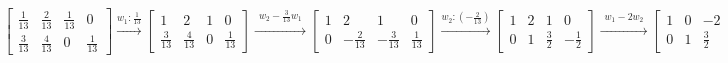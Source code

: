 \documentclass{article}
\begin{document}
    \[
        \begin{align*}
            \begin{bmatrix}
                \frac{1}{13} & \frac{2}{13} & \frac{1}{13} & 0\\\frac{3}{13} & \frac{4}{13} & 0 & \frac{1}{13}
            \end{bmatrix}
            \xrightarrow{w_{1} : \frac{1}{13}} \begin{bmatrix}
                                                   1 & 2 & 1 & 0\\\frac{3}{13} & \frac{4}{13} & 0 & \frac{1}{13}
            \end{bmatrix}
            \xrightarrow{\substack{w_{2} - \frac{3}{13}w_{1}}} \begin{bmatrix}
                                                                   1 & 2 & 1 & 0\\0 & -\frac{2}{13} & -\frac{3}{13} & \frac{1}{13}
            \end{bmatrix}
            \xrightarrow{w_{2} : \left(-\frac{2}{13}\right)} \begin{bmatrix}
                                                                 1 & 2 & 1 & 0\\0 & 1 & \frac{3}{2} & -\frac{1}{2}
            \end{bmatrix}
            \xrightarrow{\substack{w_{1} - 2w_{2}}} \begin{bmatrix}
                                                        1 & 0 & -2 & 1\\0 & 1 & \frac{3}{2} & -\frac{1}{2}
            \end{bmatrix}
        \end{align*}
    \]
\end{document}
